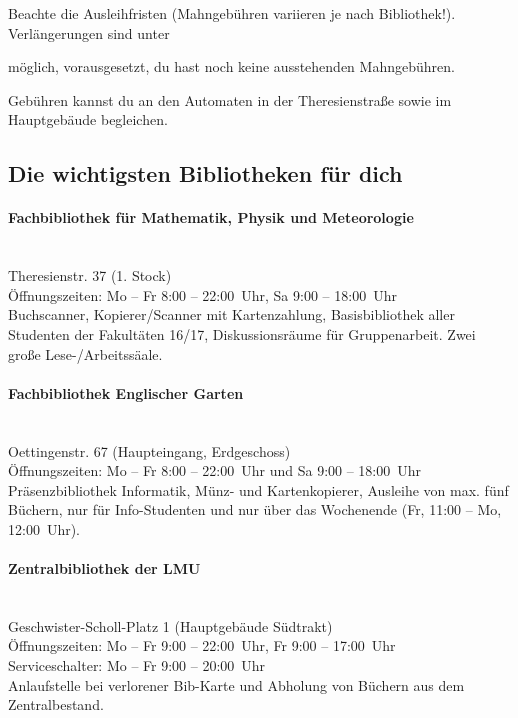 Beachte die Ausleihfristen (Mahngebühren variieren je nach Bibliothek!). 
Verlängerungen sind unter 
\begin{urlList}
\end{urlList}
möglich, vorausgesetzt, du hast noch keine ausstehenden Mahngebühren.

Gebühren kannst du an den Automaten in der Theresienstraße sowie
im Hauptgebäude begleichen.

\clearpage

\subsection{Die wichtigsten Bibliotheken für dich}

\paragraph{Fachbibliothek für Mathematik, Physik und Meteorologie}\hfill\\
Theresienstr. 37 (1. Stock)\\
Öffnungszeiten: Mo -- Fr 8:00 -- 22:00~Uhr, Sa 9:00 -- 18:00~Uhr\\
Buchscanner, Kopierer/Scanner mit Kartenzahlung, Basisbibliothek aller
Studenten der Fakultäten 16/17, Diskussionsräume für Gruppenarbeit.
Zwei große Lese-/Arbeitssäale.

\paragraph{Fachbibliothek Englischer Garten}\hfill\\
Oettingenstr. 67 (Haupteingang, Erdgeschoss)\\
Öffnungszeiten: Mo -- Fr 8:00 -- 22:00~Uhr und Sa 9:00 -- 18:00~Uhr\\
Präsenzbibliothek Informatik, Münz- und Kartenkopierer, Ausleihe von max. fünf Büchern, nur für Info-Studenten und nur über das Wochenende (Fr, 11:00 -- Mo, 12:00~Uhr).

\paragraph{Zentralbibliothek der LMU}\hfill\\
Geschwister-Scholl-Platz 1 (Hauptgebäude Südtrakt)\\
Öffnungszeiten: Mo -- Fr 9:00 -- 22:00~Uhr, Fr 9:00 -- 17:00~Uhr\\
Serviceschalter: Mo -- Fr 9:00 -- 20:00~Uhr\\
Anlaufstelle bei verlorener Bib-Karte und Abholung von Büchern aus dem Zentralbestand.

